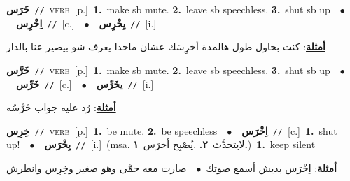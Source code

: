 \documentclass[10pt,a4paper,twoside]{article} %
\begin{document}
\begin{multicols}{2}
{\setlength\topsep{0pt}\textbf{\foreignlanguage{arabic}{خَرَس}}\ {\color{gray}\texttt{//}\color{black}}\ \textsc{verb}\ [p.]\ \textbf{1.}~make sb mute.  \textbf{2.}~leave sb speechless.  \textbf{3.}~shut sb up\ \ $\bullet$\ \ \setlength\topsep{0pt}\textbf{\foreignlanguage{arabic}{اِخْرِس}}\ {\color{gray}\texttt{//}\color{black}}\ [c.]\ \ $\bullet$\ \ \setlength\topsep{0pt}\textbf{\foreignlanguage{arabic}{يِخْرِس}}\ {\color{gray}\texttt{//}\color{black}}\ [i.]\  \begin{flushright}\color{gray}\foreignlanguage{arabic}{\textbf{\underline{\foreignlanguage{arabic}{أمثلة}}}: كنت بحاول طول هالمدة أخرِسَك عشان ماحدا يعرف شو بيصير عنا بالدار}\end{flushright}\color{black}} \vspace{2mm}

{\setlength\topsep{0pt}\textbf{\foreignlanguage{arabic}{خَرَّس}}\ {\color{gray}\texttt{//}\color{black}}\ \textsc{verb}\ [p.]\ \textbf{1.}~make sb mute.  \textbf{2.}~leave sb speechless.  \textbf{3.}~shut sb up\ \ $\bullet$\ \ \setlength\topsep{0pt}\textbf{\foreignlanguage{arabic}{خَرِّس}}\ {\color{gray}\texttt{//}\color{black}}\ [c.]\ \ $\bullet$\ \ \setlength\topsep{0pt}\textbf{\foreignlanguage{arabic}{يخَرِّس}}\ {\color{gray}\texttt{//}\color{black}}\ [i.]\  \begin{flushright}\color{gray}\foreignlanguage{arabic}{\textbf{\underline{\foreignlanguage{arabic}{أمثلة}}}: رُد عليه جواب خَرَّسُه}\end{flushright}\color{black}} \vspace{2mm}

{\setlength\topsep{0pt}\textbf{\foreignlanguage{arabic}{خِرِس}}\ {\color{gray}\texttt{//}\color{black}}\ \textsc{verb}\ [p.]\ \textbf{1.}~be mute.  \textbf{2.}~be speechless\ \ $\bullet$\ \ \setlength\topsep{0pt}\textbf{\foreignlanguage{arabic}{اِخْرَس}}\ {\color{gray}\texttt{//}\color{black}}\ [c.]\ \textbf{1.}~shut up!\ \ $\bullet$\ \ \setlength\topsep{0pt}\textbf{\foreignlanguage{arabic}{يِخْرَس}}\ {\color{gray}\texttt{//}\color{black}}\ [i.]\ \color{gray}(msa. \foreignlanguage{arabic}{لايتحدَّث}~\foreignlanguage{arabic}{\textbf{٢.}}  .\foreignlanguage{arabic}{يُصْبِح أخرَس}~\foreignlanguage{arabic}{\textbf{١.}})\color{black}\ \textbf{1.}~keep silent\  \begin{flushright}\color{gray}\foreignlanguage{arabic}{\textbf{\underline{\foreignlanguage{arabic}{أمثلة}}}: اِخْرَس بديش أسمع صوتك\ $\bullet$\ \  صارت معه حمَّى وهو صغير وخِرِس وانطرش}\end{flushright}\color{black}} \vspace{2mm}


\end{multicols}
\end{document}

